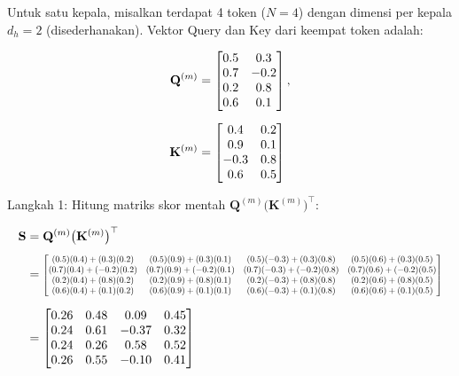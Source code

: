 \noindent
Untuk satu kepala, misalkan terdapat 4 token ($N=4$) dengan dimensi
per kepala $d_h=2$ (disederhanakan). Vektor Query dan Key dari
keempat token adalah:
 
\vspace{0.5cm}
\begin{align*}
  \mathbf{Q}^{(m)}
  &= \begin{bmatrix}
       0.5 & 0.3 \\
       0.7 & -0.2 \\
       0.2 & 0.8 \\
       0.6 & 0.1
     \end{bmatrix}, \notag \\[6pt]
  \mathbf{K}^{(m)}
  &= \begin{bmatrix}
       0.4 & 0.2 \\
       0.9 & 0.1 \\
       -0.3 & 0.8 \\
       0.6 & 0.5
     \end{bmatrix}
\end{align*}
\vspace{0.5cm}
 
\noindent Langkah 1: Hitung matriks skor mentah
$\mathbf{Q}^{(m)}\bigl(\mathbf{K}^{(m)}\bigr)^\top$:
 
\vspace{0.5cm}
\begin{align}
  \mathbf{S} &= \mathbf{Q}^{(m)}\bigl(\mathbf{K}^{(m)}\bigr)^\top \notag \\[4pt]
  &= \scalebox{0.70}{\ensuremath{\begin{bmatrix}
       (0.5)(0.4)+(0.3)(0.2) & (0.5)(0.9)+(0.3)(0.1)
         & (0.5)(-0.3)+(0.3)(0.8) & (0.5)(0.6)+(0.3)(0.5) \\
       (0.7)(0.4)+(-0.2)(0.2) & (0.7)(0.9)+(-0.2)(0.1)
         & (0.7)(-0.3)+(-0.2)(0.8) & (0.7)(0.6)+(-0.2)(0.5) \\
       (0.2)(0.4)+(0.8)(0.2) & (0.2)(0.9)+(0.8)(0.1)
         & (0.2)(-0.3)+(0.8)(0.8) & (0.2)(0.6)+(0.8)(0.5) \\
       (0.6)(0.4)+(0.1)(0.2) & (0.6)(0.9)+(0.1)(0.1)
         & (0.6)(-0.3)+(0.1)(0.8) & (0.6)(0.6)+(0.1)(0.5)
     \end{bmatrix}}} \notag \\[6pt]
  &= \begin{bmatrix}
       0.26 & 0.48 & 0.09 & 0.45 \\
       0.24 & 0.61 & -0.37 & 0.32 \\
       0.24 & 0.26 & 0.58 & 0.52 \\
       0.26 & 0.55 & -0.10 & 0.41
     \end{bmatrix}
\end{align}
\vspace{0.5cm}
 
